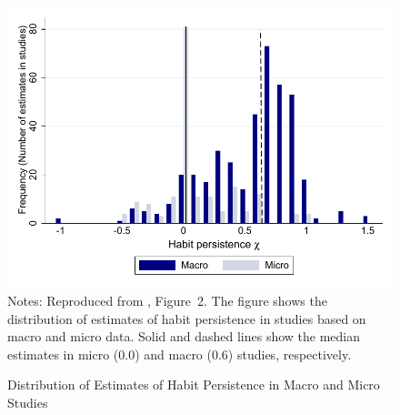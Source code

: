 \documentclass[titlepage]{\econtex}\newcommand{\texname}{cAndCwithStickyE}
\begin{document}
\begin{figure}
\caption{Distribution of Estimates of Habit Persistence in Macro and Micro Studies}
\label{microMacroMetaHistogram}
{ \includegraphics[width=1.0\textwidth]{./Figures/microMacroMetaHistogram}}
\footnotesize Notes: Reproduced from \cite{hrsHabit}, Figure~2. The figure shows the distribution of estimates of habit persistence in studies based on macro and micro data. Solid and dashed lines show the median estimates in micro (0.0) and macro (0.6) studies, respectively.
\end{figure}
\end{document}
